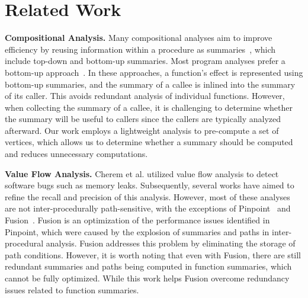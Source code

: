 \section{Related Work}
\textbf{Compositional Analysis.}
Many compositional analyses aim to improve efficiency by reusing information within a procedure as summaries~\cite{aikenSaturnManual, babic2008calysto, mcpeak2013scalable, shi2018pinpoint, shi2020pipelining, reps1995precise, sagiv1996precise}, which include top-down and bottom-up summaries.
Most program analyses prefer a bottom-up approach~\cite{aikenSaturnManual, babic2008calysto, mcpeak2013scalable, shi2018pinpoint, shi2020pipelining}. 
In these approaches, a function's effect is represented using bottom-up summaries, and the summary of a callee is inlined into the summary of its caller. 
This avoids redundant analysis of individual functions.
However, when collecting the summary of a callee, it is challenging to determine whether the summary will be useful to callers since the callers are typically analyzed afterward. 
Our work employs a lightweight analysis to pre-compute a set of vertices, which allows us to determine whether a summary should be computed and reduces unnecessary computations.


\textbf{Value Flow Analysis.}
Cherem et al.\cite{cherem2007practical} utilized value flow analysis to detect software bugs such as memory leaks. 
Subsequently, several works have aimed to refine the recall and precision of this analysis\cite{shi2018pinpoint, shi2020conquering, sui2016svf, sui2014detecting, shi2021path}. 
However, most of these analyses are not inter-procedurally path-sensitive, with the exceptions of Pinpoint~\cite{shi2018pinpoint} and Fusion~\cite{shi2021path}.
Fusion is an optimization of the performance issues identified in Pinpoint, which were caused by the explosion of summaries and paths in inter-procedural analysis. Fusion addresses this problem by eliminating the storage of path conditions. 
However, it is worth noting that even with Fusion, there are still redundant summaries and paths being computed in function summaries, which cannot be fully optimized.
While this work helps Fusion overcome redundancy issues related to function summaries.

